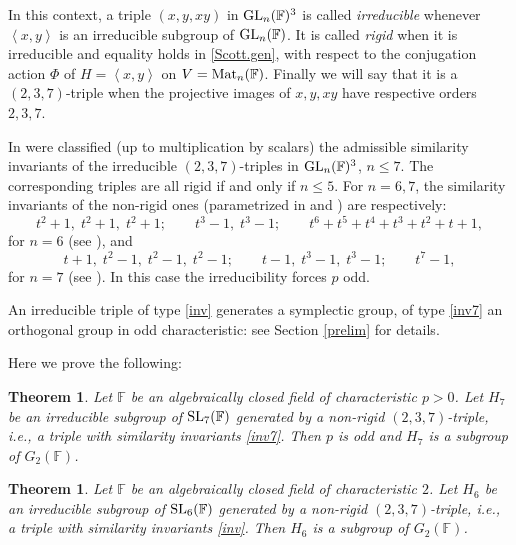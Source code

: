 \documentclass{amsart}
\newtheorem{theorem}[lemma]{Theorem}
\theoremstyle{remark}
\begin{document}
In this context, a triple $(x,y,xy)$ in ${\mathop{\rm GL}\nolimits}_n({\mathbb{F}})^3$  is called \emph{irreducible} whenever
$\left\langle x,y\right\rangle$ is an irreducible subgroup of ${\mathop{\rm GL}\nolimits}_n({\mathbb{F}})$. It is called  
\emph{rigid} when it is irreducible  and equality holds in \eqref{Scott.gen}, with respect to  the conjugation action $\Phi$ 
of $H=\left\langle x,y\right\rangle$ on  $V={\mathop{\rm Mat}\nolimits}_n({\mathbb{F}})$. Finally we will say that it is a $(2,3,7)$-triple 
when  the projective images of $x,y,xy$ have respective orders $2,3,7$.

In \cite{TV1} were classified (up to multiplication by scalars)
the admissible similarity invariants of the irreducible  $(2,3,7)$-triples
in ${\mathop{\rm GL}\nolimits}_n({\mathbb{F}})^3$, $n\le 7$. The corresponding triples  are all rigid if and only if $n\le 5$.
For $n=6,7$, the similarity invariants of the non-rigid ones (parametrized in \cite{V3} and \cite{TV2}) are  respectively: 
\begin{equation}\label{inv}
t^ 2+1, \; t^ 2+1,\; t^ 2+1; \qquad t^3-1,\; t^3-1; \qquad t^ 6+t^ 5+t^ 4+t^ 3+t^2+t+1,
\end{equation}
for $n=6$ (see  \cite[1.1.1 page 349 and 2.1.1 page 350]{TV1}), and  
\begin{equation}\label{inv7}
t+1, \;t^ 2-1, \; t^ 2-1,\; t^ 2-1; \qquad t-1,\;t^3-1,\; t^3-1; \qquad t^ 7-1,
\end{equation}
for $n=7$ (see \cite[1.1 page 351]{TV1}). In this case the irreducibility forces $p$ odd.

An irreducible triple of type \eqref{inv} generates a symplectic group, of type
\eqref{inv7} 
an orthogonal group in odd characteristic: see Section \ref{prelim} for details.

Here we prove the following:

\begin{theorem}\label{p7}
Let ${\mathbb{F}}$ be an algebraically closed field of characteristic $p>0$. Let $H_7$ 
be an irreducible subgroup of ${\mathop{\rm SL}\nolimits}_7({\mathbb{F}})$ generated by a non-rigid 
$(2,3,7)$-triple, i.e., a triple with similarity invariants \eqref{inv7}. Then $p$ is odd 
and  $H_7$ is a subgroup of  $G_2({\mathbb{F}})$.
\end{theorem}

\begin{theorem}\label{main}
Let ${\mathbb{F}}$ be an algebraically closed field of characteristic $2$. Let $H_6$ 
be an irreducible subgroup of ${\mathop{\rm SL}\nolimits}_6({\mathbb{F}})$ generated by a non-rigid 
$(2,3,7)$-triple, i.e., a triple with similarity invariants \eqref{inv}. Then $H_6$ is a subgroup of  $G_2({\mathbb{F}})$.
\end{theorem}
\end{document}
